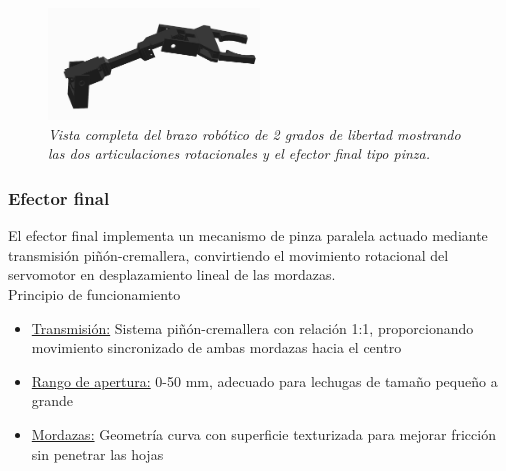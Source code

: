 \begin{figure}[H]
    \centering
    \includegraphics[width=0.5\textwidth]{img/brazo_completo.jpg}
    \caption{\textit{Vista completa del brazo robótico de 2 grados de libertad mostrando las dos articulaciones rotacionales y el efector final tipo pinza.}}
    \label{fig:brazo_Real}
\end{figure}

\subsubsection{Efector final}

El efector final implementa un mecanismo de pinza paralela actuado mediante transmisión piñón-cremallera, convirtiendo el movimiento rotacional del servomotor en desplazamiento lineal de las mordazas.\\

Principio de funcionamiento

\begin{itemize}[label=$\bullet$]
    \item \underline{Transmisión:} Sistema piñón-cremallera con relación 1:1, proporcionando movimiento sincronizado de ambas mordazas hacia el centro
    \item \underline{Rango de apertura:} 0-50 mm, adecuado para lechugas de tamaño pequeño a grande
    \item \underline{Mordazas:} Geometría curva con superficie texturizada para mejorar fricción sin penetrar las hojas
\end{itemize}

